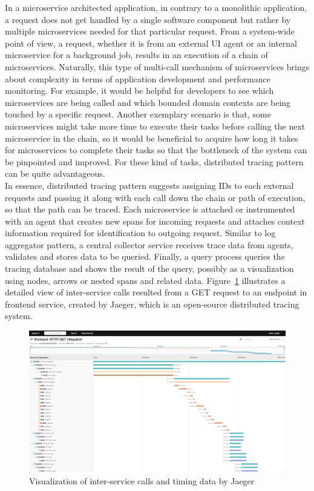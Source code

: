 \documentclass{Configuration_Files/PoliMi3i_thesis}
\begin{document}
In a microservice architected application, in contrary to a monolithic application, a request does not get handled by a single software component but rather by multiple microservices needed for that particular request.
From a system-wide point of view, a request, whether it is from an external UI agent or an internal microservice for a background job, results in an execution of a chain of microservices.
Naturally, this type of multi-call mechanism of microservices brings about complexity in terms of application development and performance monitoring.
For example, it would be helpful for developers to see which microservices are being called and which bounded domain contexts are being touched by a specific request.
Another exemplary scenario is that, some microservices might take more time to execute their tasks before calling the next microservice in the chain, so it would be beneficial to acquire how long it takes for microservices to complete their tasks so that the bottleneck of the system can be pinpointed and improved.
For these kind of tasks, distributed tracing pattern can be quite advantageous.
\\
In essence, distributed tracing pattern suggests assigning IDs to each external requests and passing it along with each call down the chain or path of execution, so that the path can be traced.
Each microservice is attached or instrumented with an agent that creates new spans for incoming requests and attaches context information required for identification to outgoing request.
Similar to log aggregator pattern, a central collector service receives trace data from agents, validates and stores data to be queried.
Finally, a query process queries the tracing database and shows the result of the query, possibly as a visualization using nodes, arrows or nested spans and related data.
Figure~\ref{fig:jaeger_trace} illustrates a detailed view of inter-service calls resulted from a GET request to an endpoint in frontend service, created by Jaeger, which is an open-source distributed tracing system.

\begin{figure}[H]
\centering
\includegraphics[width=1.0\textwidth]{myImages/trace-detail-ss.png}
\caption{Visualization of inter-service calls and timing data by Jaeger}
\label{fig:jaeger_trace}
\end{figure}
\end{document}
